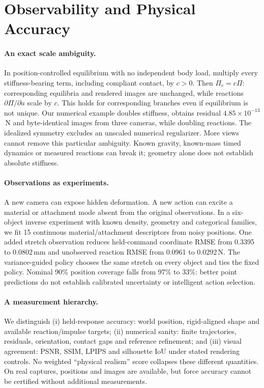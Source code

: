 \documentclass[10pt,twocolumn,letterpaper]{article}
\begin{document}
\section{Observability and Physical Accuracy}
\paragraph{An exact scale ambiguity.}
In position-controlled equilibrium with no independent body load, multiply every stiffness-bearing term, including compliant contact, by $c>0$. Then $\Pi_c=c\Pi$: corresponding equilibria and rendered images are unchanged, while reactions $\partial\Pi/\partial a$ scale by $c$. This holds for corresponding branches even if equilibrium is not unique. Our numerical example doubles stiffness, obtains residual $4.85\!\times\!10^{-13}$\,N and byte-identical images from three cameras, while doubling reactions. The idealized symmetry excludes an unscaled numerical regularizer. More views cannot remove this particular ambiguity. Known gravity, known-mass timed dynamics or measured reactions can break it; geometry alone does not establish absolute stiffness.

\paragraph{Observations as experiments.}
A new camera can expose hidden deformation. A new action can excite a material or attachment mode absent from the original observations. In a six-object inverse experiment with known density, geometry and categorical families, we fit 15 continuous material/attachment descriptors from noisy positions. One added stretch observation reduces held-command coordinate RMSE from 0.3395 to 0.0802\,mm and unobserved reaction RMSE from 0.0961 to 0.0292\,N. The variance-guided policy chooses the same stretch on every object and ties the fixed policy. Nominal 90\% position coverage falls from 97\% to 33\%: better point predictions do not establish calibrated uncertainty or intelligent action selection.

\paragraph{A measurement hierarchy.}
We distinguish (i) held-response accuracy: world position, rigid-aligned shape and available reaction/impulse targets; (ii) numerical sanity: finite trajectories, residuals, orientation, contact gaps and reference refinement; and (iii) visual agreement: PSNR, SSIM, LPIPS and silhouette IoU under stated rendering controls. No weighted ``physical realism'' score collapses these different quantities. On real captures, positions and images are available, but force accuracy cannot be certified without additional measurements.
\end{document}
